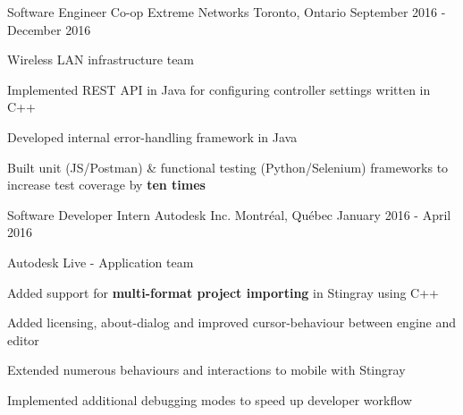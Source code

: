 


\begin{cventries}


\cventry
{Software Engineer Co-op}
{Extreme Networks}
{Toronto, Ontario}
{September 2016 - December 2016}
{ %
Wireless LAN infrastructure team
\begin{cvitems}
\item[]
\item {Implemented REST API in Java for configuring controller settings written in C++}
\item {Developed internal error-handling framework in Java}
\item {Built unit (JS/Postman) \& functional testing (Python/Selenium) frameworks to increase test coverage by \textbf{ten times}}
\end{cvitems}
}


\cventry
{Software Developer Intern}
{Autodesk Inc.}
{Montréal, Québec}
{January 2016 - April 2016}
{ %
Autodesk Live - Application team
\begin{cvitems}
\item[]
\item {Added support for \textbf{multi-format project importing} in Stingray using C++}
\item {Added licensing, about-dialog and improved cursor-behaviour between engine and editor}
\item {Extended numerous behaviours and interactions to mobile with Stingray}
\item {Implemented additional debugging modes to speed up developer workflow}
\end{cvitems}
}



\end{cventries}

